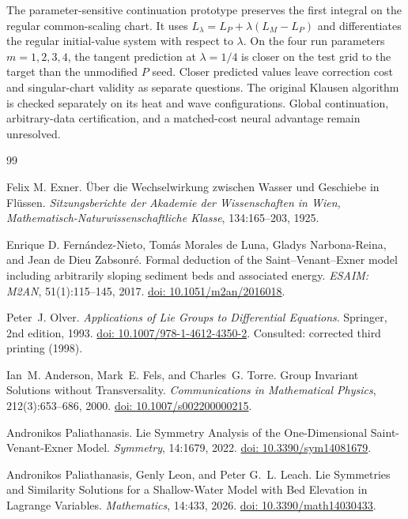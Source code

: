 \documentclass[12pt,a4paper,oneside]{report}
\numberwithin{equation}{chapter}
\theoremstyle{remark}\newtheorem{remark}[theorem]{Remark}
\newcommand{\doi}[1]{\href{https://doi.org/#1}{doi: #1}}
\begin{document}
The parameter-sensitive continuation prototype preserves the first integral on the regular common-scaling chart. It uses $L_\lambda=L_P+\lambda(L_M-L_P)$ and differentiates the regular initial-value system with respect to $\lambda$. On the four run parameters $m=1,2,3,4$, the tangent prediction at $\lambda=1/4$ is closer on the test grid to the target than the unmodified $P$ seed. Closer predicted values leave correction cost and singular-chart validity as separate questions. The original Klausen algorithm is checked separately on its heat and wave configurations. Global continuation, arbitrary-data certification, and a matched-cost neural advantage remain unresolved.
\clearpage
\begingroup
\small
\raggedright
{}
\setlength{\bibsep}{1pt plus .3pt minus .3pt}
\begin{thebibliography}{99}
Felix M. Exner. \"Uber die Wechselwirkung zwischen Wasser und Geschiebe in Fl\"ussen. \emph{Sitzungsberichte der Akademie der Wissenschaften in Wien, Mathematisch-Naturwissenschaftliche Klasse}, 134:165--203, 1925.

Enrique D. Fern\'andez-Nieto, Tom\'as Morales de Luna, Gladys Narbona-Reina, and Jean de Dieu Zabsonr\'e. Formal deduction of the Saint--Venant--Exner model including arbitrarily sloping sediment beds and associated energy. \emph{ESAIM: M2AN}, 51(1):115--145, 2017. \doi{10.1051/m2an/2016018}.

Peter~J. Olver. \emph{Applications of Lie Groups to Differential Equations}. Springer, 2nd edition, 1993. \doi{10.1007/978-1-4612-4350-2}. Consulted: corrected third printing (1998).

Ian~M. Anderson, Mark~E. Fels, and Charles~G. Torre. Group Invariant Solutions without Transversality. \emph{Communications in Mathematical Physics}, 212(3):653--686, 2000. \doi{10.1007/s002200000215}.

Andronikos Paliathanasis. Lie Symmetry Analysis of the One-Dimensional Saint-Venant-Exner Model. \emph{Symmetry}, 14:1679, 2022. \doi{10.3390/sym14081679}.

Andronikos Paliathanasis, Genly Leon, and Peter G.~L. Leach. Lie Symmetries and Similarity Solutions for a Shallow-Water Model with Bed Elevation in Lagrange Variables. \emph{Mathematics}, 14:433, 2026. \doi{10.3390/math14030433}.


\end{thebibliography}
\end{document}
